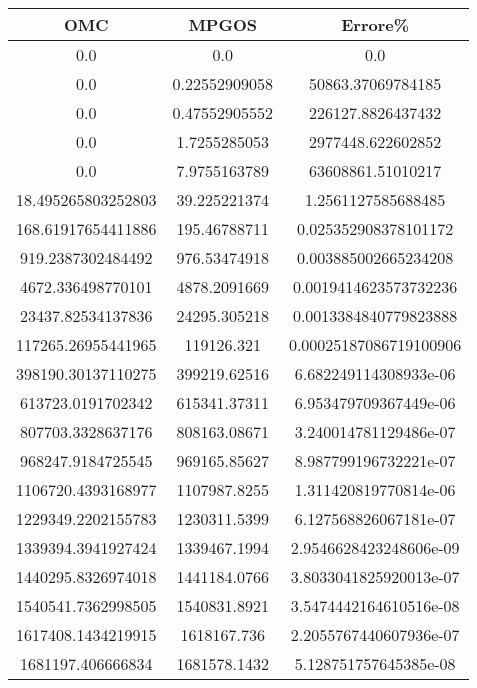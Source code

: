 \begin{longtable}[!h]{|c|c|c|}
    \hline
    \textbf{OMC} & \textbf{MPGOS} & \textbf{Errore\%}\\
    \hline\hline
    \endhead
    0.0 & 0.0 & 0.0\\
    \hline
    0.0 & 0.22552909058 & 50863.37069784185\\
    \hline
    0.0 & 0.47552905552 & 226127.8826437432\\
    \hline
    0.0 & 1.7255285053 & 2977448.622602852\\
    \hline
    0.0 & 7.9755163789 & 63608861.51010217\\
    \hline
    18.495265803252803 & 39.225221374 & 1.2561127585688485\\
    \hline
    168.61917654411886 & 195.46788711 & 0.025352908378101172\\
    \hline
    919.2387302484492 & 976.53474918 & 0.003885002665234208\\
    \hline
    4672.336498770101 & 4878.2091669 & 0.0019414623573732236\\
    \hline
    23437.82534137836 & 24295.305218 & 0.0013384840779823888\\
    \hline
    117265.26955441965 & 119126.321 & 0.00025187086719100906\\
    \hline
    398190.30137110275 & 399219.62516 & 6.682249114308933e-06\\
    \hline
    613723.0191702342 & 615341.37311 & 6.953479709367449e-06\\
    \hline
    807703.3328637176 & 808163.08671 & 3.240014781129486e-07\\
    \hline
    968247.9184725545 & 969165.85627 & 8.987799196732221e-07\\
    \hline
    1106720.4393168977 & 1107987.8255 & 1.311420819770814e-06\\
    \hline
    1229349.2202155783 & 1230311.5399 & 6.127568826067181e-07\\
    \hline
    1339394.3941927424 & 1339467.1994 & 2.9546628423248606e-09\\
    \hline
    1440295.8326974018 & 1441184.0766 & 3.8033041825920013e-07\\
    \hline
    1540541.7362998505 & 1540831.8921 & 3.5474442164610516e-08\\
    \hline
    1617408.1434219915 & 1618167.736 & 2.2055767440607936e-07\\
    \hline
    1681197.406666834 & 1681578.1432 & 5.128751757645385e-08\\

\end{longtable}
